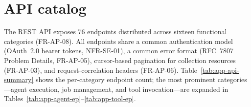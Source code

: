\documentclass[a4paper,noexaminfo]{sapthesis}
\begin{document}
\section{API catalog}
\label{app:api-catalog}

The REST API exposes 76 endpoints distributed across sixteen functional
categories (FR-AP-08).  All endpoints share a common authentication
model (OAuth~2.0 bearer tokens, NFR-SE-01), a common error format
(RFC~7807 Problem Details, FR-AP-05), cursor-based pagination for
collection resources (FR-AP-03), and request-correlation headers
(FR-AP-06).  Table~\ref{tab:app-api-summary} shows the per-category
endpoint count; the most prominent categories---agent execution, job
management, and tool invocation---are expanded in
Tables~\ref{tab:app-agent-ep}--\ref{tab:app-tool-ep}.
\end{document}
